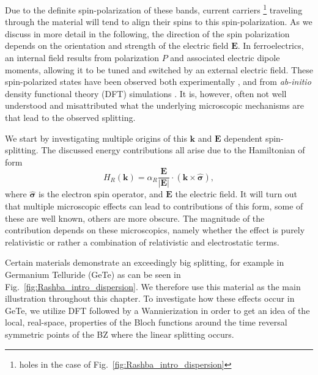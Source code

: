Due to the definite spin-polarization of these bands, current carriers \footnote{holes in the case of Fig.~\ref{fig:Rashba_intro_dispersion}} traveling through the material will tend to align their spins to this spin-polarization.
As we discuss in more detail in the following, the direction of the spin polarization depends on the orientation and strength of the electric field $\bm{E}$.
In ferroelectrics, an internal field results from polarization $P$ and associated electric dipole moments, allowing it to be tuned and switched by an external electric field.
These spin-polarized states have been observed both experimentally \cite{Ishizaka2011,Liebmann2016,Krempasky2015}, and from {\it ab-initio} density functional theory (DFT) simulations \cite{DiSante2013}.
It is, however, often not well understood and misattributed what the underlying microscopic mechanisms are that lead to the observed splitting.

We start by investigating multiple origins of this $\bm{k}$ and $\bm{E}$ dependent spin-splitting. The discussed energy contributions all arise due to the Hamiltonian of form
\begin{equation}
	\label{eq:Rashba_form}
	H_R(\bm{k}) = \alpha_R \frac{\bm{E}}{|\bm{E}|} \cdot (\bm{k} \times \hat{\bm{\sigma}}),
\end{equation}
where $\hat{\bm{\sigma}}$ is the electron spin operator, and $\bm{E}$ the electric field.
It will turn out that multiple microscopic effects can lead to contributions of this form, some of these are well known, others are more obscure.
The magnitude of the contribution depends on these microscopics, namely whether the effect is purely relativistic or rather a combination of relativistic and electrostatic terms.

Certain materials demonstrate an exceedingly big splitting, for example in Germanium Telluride (GeTe) as can be seen in Fig.~\ref{fig:Rashba_intro_dispersion}.
We therefore use this material as the main illustration throughout this chapter.
To investigate how these effects occur in GeTe, we utilize DFT followed by a Wannierization in order to get an idea of the local, real-space, properties of the Bloch functions around the time reversal symmetric points of the BZ where the linear splitting occurs.

